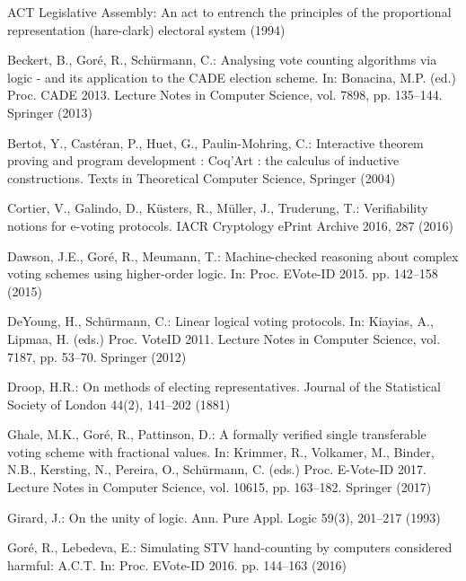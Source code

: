 \documentclass{llncs}
\begin{document}
\begin{thebibliography}{10}
\providecommand{\url}[1]{\texttt{#1}}
\providecommand{\urlprefix}{URL }

{ACT Legislative Assembly}: An act to entrench the principles of the
  proportional representation (hare-clark) electoral system (1994)

Beckert, B., Gor{\'{e}}, R., Sch{\"{u}}rmann, C.: Analysing vote counting
  algorithms via logic - and its application to the {CADE} election scheme. In:
  Bonacina, M.P. (ed.) Proc. CADE 2013. Lecture Notes in Computer Science, vol.
  7898, pp. 135--144. Springer (2013)

Bertot, Y., Cast{\'e}ran, P., Huet, G., Paulin-Mohring, C.: Interactive theorem
  proving and program development : Coq'Art : the calculus of inductive
  constructions. Texts in Theoretical Computer Science, Springer (2004)

Cortier, V., Galindo, D., K{\"{u}}sters, R., M{\"{u}}ller, J., Truderung, T.:
  Verifiability notions for e-voting protocols. {IACR} Cryptology ePrint
  Archive  2016,  287 (2016)

Dawson, J.E., Gor{\'{e}}, R., Meumann, T.: Machine-checked reasoning about
  complex voting schemes using higher-order logic. In: Proc. EVote-ID 2015. pp.
  142--158 (2015)

DeYoung, H., Sch{\"{u}}rmann, C.: Linear logical voting protocols. In: Kiayias,
  A., Lipmaa, H. (eds.) Proc. VoteID 2011. Lecture Notes in Computer Science,
  vol. 7187, pp. 53--70. Springer (2012)

Droop, H.R.: On methods of electing representatives. Journal of the Statistical
  Society of London  44(2),  141--202 (1881)

Ghale, M.K., Gor{\'{e}}, R., Pattinson, D.: A formally verified single
  transferable voting scheme with fractional values. In: Krimmer, R., Volkamer,
  M., Binder, N.B., Kersting, N., Pereira, O., Sch{\"{u}}rmann, C. (eds.) Proc.
  E-Vote-ID 2017. Lecture Notes in Computer Science, vol. 10615, pp. 163--182.
  Springer (2017)

Girard, J.: On the unity of logic. Ann. Pure Appl. Logic  59(3),  201--217
  (1993)

Gor{\'{e}}, R., Lebedeva, E.: Simulating {STV} hand-counting by computers
  considered harmful: {A.C.T}. In: Proc. EVote-ID 2016. pp. 144--163 (2016)


\end{thebibliography}
\end{document}
